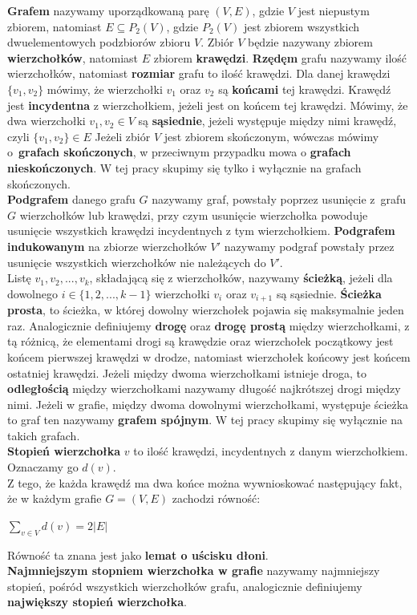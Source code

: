 \documentclass[12pt,a4paper,titlepage]{article}
\newcommand\tab[1][1cm]{\hspace*{#1}}
\begin{document}
\textbf{Grafem} nazywamy uporządkowaną parę $(V, E)$, gdzie $V$ jest niepustym zbiorem, natomiast $E \subseteq P_2 (V)$, gdzie $P_2(V)$ jest zbiorem wszystkich dwuelementowych podzbiorów zbioru $V$. Zbiór $V$ będzie nazywany zbiorem \textbf{wierzchołków}, natomiast $E$ zbiorem \textbf{krawędzi}. \textbf{Rzędęm} grafu nazywamy ilość wierzchołków, natomiast \textbf{rozmiar} grafu to ilość krawędzi. Dla danej krawędzi $\{v_1 , v_2 \}$ mówimy, że wierzchołki $v_1$ oraz $v_2$ są \textbf{końcami} tej krawędzi. Krawędź jest \textbf{incydentna} z wierzchołkiem, jeżeli jest on końcem tej krawędzi. Mówimy, że dwa wierzchołki $v_1, v_2 \in V$ są \textbf{sąsiednie}, jeżeli występuje między nimi krawędź, czyli $\{v_1, v_2\} \in E$
Jeżeli zbiór $V$ jest zbiorem skończonym, wówczas mówimy o~\textbf{grafach skończonych}, w przeciwnym przypadku mowa o \textbf{grafach nieskończonych}. W tej pracy skupimy się tylko i wyłącznie na grafach skończonych.\\
\tab[0.6cm]\textbf{Podgrafem} danego grafu $G$ nazywamy graf, powstały poprzez usunięcie z~grafu $G$ wierzchołków lub krawędzi, przy czym usunięcie wierzchołka powoduje usunięcie wszystkich krawędzi incydentnych z tym wierzchołkiem. \textbf{Podgrafem indukowanym} na zbiorze wierzchołków $V'$ nazywamy podgraf powstały przez usunięcie wszystkich wierzchołków nie należących do $V'$. \\
\tab[0.6cm]Listę $v_1, v_2, ..., v_k$, składającą się z wierzchołków, nazywamy \textbf{ścieżką}, jeżeli dla dowolnego $i \in \{1,2,..., k-1\} $ wierzchołki $v_i$ oraz $v_{i+1}$ są sąsiednie. \textbf{Ścieżka prosta}, to ścieżka, w której dowolny wierzchołek pojawia się maksymalnie jeden raz. Analogicznie definiujemy \textbf{drogę} oraz \textbf{drogę prostą} między wierzchołkami, z tą różnicą, że elementami drogi są krawędzie oraz wierzchołek początkowy jest końcem pierwszej krawędzi w drodze, natomiast wierzchołek końcowy jest końcem ostatniej krawędzi.
Jeżeli między dwoma wierzchołkami istnieje droga, to \textbf{odległością} między wierzchołkami nazywamy długość najkrótszej drogi między nimi. Jeżeli w grafie, między dwoma dowolnymi wierzchołkami, występuje ścieżka to graf ten nazywamy \textbf{grafem spójnym}. W tej pracy skupimy się wyłącznie na takich grafach.\\
\tab[0.6cm]\textbf{Stopień wierzchołka} $v$ to ilość krawędzi, incydentnych z danym wierzchołkiem. Oznaczamy go $d(v)$. \\
\tab[0.6cm]Z tego, że każda krawędź ma dwa końce można wywnioskować następujący fakt, że w każdym grafie $G=(V,E)$ zachodzi równość:
\begin{center}$\sum_{v \in V}d(v) = 2|E|$ \end{center}
Równość ta znana jest jako \textbf{lemat o uścisku dłoni}.\\
\tab[0.6cm]\textbf{Najmniejszym stopniem wierzchołka w grafie} nazywamy najmniejszy stopień, pośród wszystkich wierzchołków grafu, analogicznie definiujemy \textbf{największy stopień wierzchołka}. \\
\end{document}
